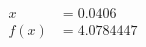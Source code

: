 \documentclass[preview]{standalone}
\begin{document}
\begin{align*}
x &= 0.0406\\f(x) &= 4.0784447
\end{align*}
\end{document}
